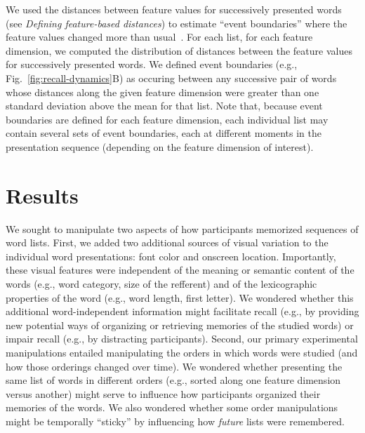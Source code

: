 \documentclass[11pt]{article}
\begin{document}
We used the distances between feature values for successively presented words
(see \textit{Defining feature-based distances}) to estimate ``event
boundaries'' where the feature values changed more than
usual~\citep{EzzyDava11, MannEtal16,RadvCope06, SwalEtal09, SwalEtal11,
DuBrDava16}. For each list, for each feature dimension, we computed the
distribution of distances between the feature values for successively presented
words. We defined event boundaries (e.g., Fig.~\ref{fig:recall-dynamics}B) as
occuring between any successive pair of words whose distances along the given
feature dimension were greater than one standard deviation above the mean for
that list. Note that, because event boundaries are defined for each feature
dimension, each individual list may contain several sets of event boundaries,
each at different moments in the presentation sequence (depending on the
feature dimension of interest).

\section*{Results}

We sought to manipulate two aspects of how participants memorized sequences of
word lists. First, we added two additional sources of visual variation to the
individual word presentations: font color and onscreen location. Importantly,
these visual features were independent of the meaning or semantic content of
the words (e.g., word category, size of the refferent) and of the lexicographic
properties of the word (e.g., word length, first letter). We wondered whether
this additional word-independent information might facilitate recall (e.g., by
providing new potential ways of organizing or retrieving memories of the
studied words) or impair recall (e.g., by distracting participants). Second,
our primary experimental manipulations entailed manipulating the orders in
which words were studied (and how those orderings changed over time). We
wondered whether presenting the same list of words in different orders (e.g.,
sorted along one feature dimension versus another) might serve to influence how
participants organized their memories of the words. We also wondered whether
some order manipulations might be temporally ``sticky'' by influencing how
\textit{future} lists were remembered.
\end{document}
